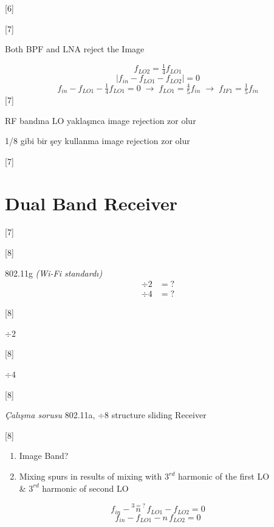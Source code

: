 \documentclass[11pt,a4paper]{article}
\begin{document}
[6]

[7]

Both BPF and LNA reject the Image

\begin{ornek}
\[ f_{LO2} = \tfrac{1}{4} f_{LO1} \]
\[ |f_{in} - f_{LO1} - f_{LO2}| = 0 \]
\[ f_{in} - f_{LO1} - \tfrac{1}{4} f_{LO1} = 0 \;\rightarrow\; f_{LO1} = \tfrac{4}{5} f_{in} \;\rightarrow\; f_{IF1} = \tfrac{1}{5} f_{in} \]
[7]
\end{ornek}

RF bandına LO yaklaşınca image rejection zor olur

1/8 gibi bir şey kullanma \quad image rejection zor olur

[7]

\section{Dual Band Receiver}
[7]

[8]

802.11g \quad \textit{(Wi-Fi standardı)}
\begin{align*}
\div 2 &= ?\\
\div 4 &= ?
\end{align*}

[8]

$\div 2$

[8]

$\div 4$

[8]

\begin{ornek}
\textit{Çalışma sorusu} \quad 802.11a, $\div 8$ structure sliding Receiver

[8]

\begin{enumerate}[label=\arabic*)]
\item Image Band?
\item Mixing spurs in results of mixing with $3^{rd}$ harmonic of the first LO\\
\& $3^{rd}$ harmonic of second LO
\end{enumerate}
\[ f_{in} - \overset{\scriptstyle 3=?}{n}\,f_{LO1} - f_{LO2} = 0 \]
\[ f_{in} - f_{LO1} - n\,f_{LO2} = 0 \]
\end{ornek}
\end{document}
